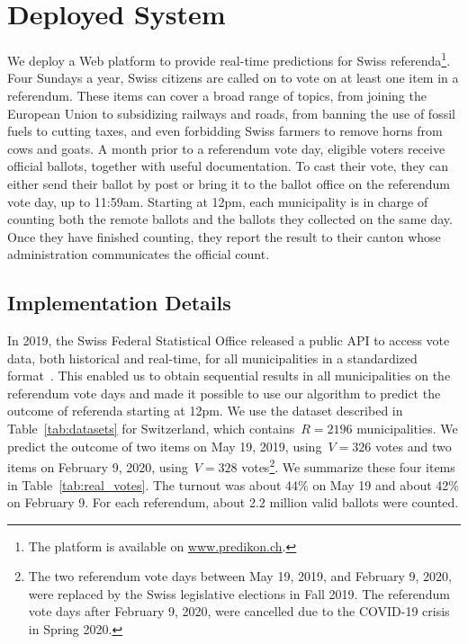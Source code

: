 \section{Deployed System}%
\label{sec:depsys}

We deploy a Web platform to provide real-time predictions for Swiss referenda\footnote{The platform is available on \href{http://www.predikon.ch}{www.predikon.ch}.}.
Four Sundays a year, Swiss citizens are called on to vote on at least one item in a referendum.
These items can cover a broad range of topics, from joining the European Union to subsidizing railways and roads, from banning the use of fossil fuels to cutting taxes, and even forbidding Swiss farmers to remove horns from cows and goats.
A month prior to a referendum vote day, eligible voters receive official ballots, together with useful documentation.
To cast their vote, they can either send their ballot by post or bring it to the ballot office on the referendum vote day, up to 11:59am.
Starting at 12pm, each municipality is in charge of counting both the remote ballots and the ballots they collected on the same day.
Once they have finished counting, they report the result to their canton whose administration communicates the official count.

\subsection{Implementation Details}

In 2019, the Swiss Federal Statistical Office released a public API to access vote data, both historical and real-time, for all municipalities in a standardized format~\cite{confederation2020open}.
This enabled us to obtain sequential results in all municipalities on the referendum vote days and made it possible to use our algorithm to predict the outcome of referenda starting at 12pm.
We use the dataset described in Table~\ref{tab:datasets} for Switzerland, which contains~$R = 2196$ municipalities.
We predict the outcome of two items on May 19, 2019, using~$V = 326$ votes and two items on February 9, 2020, using~$V = 328$ votes\footnote{The two referendum vote days between May 19, 2019, and February 9, 2020, were replaced by the Swiss legislative elections in Fall 2019. The referendum vote days after February 9, 2020, were cancelled due to the COVID-19 crisis in Spring 2020.}.
We summarize these four items in Table~\ref{tab:real_votes}.
The turnout was about 44\% on May 19 and about 42\% on February 9.
For each referendum, about 2.2 million valid ballots were counted.

